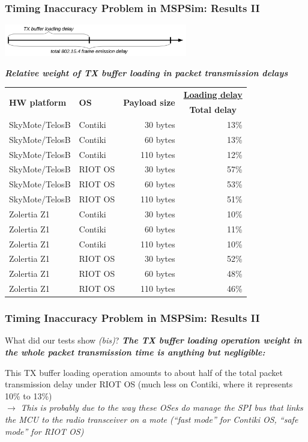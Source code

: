 \documentclass[10pt,c]{beamer}
\renewcommand{\emph}[1]{\textbf{\textit{#1}}}
\newcommand{\tblcaption}[1]{\textbf{\textsl{\small#1}}\vspace{0.1cm}}
\begin{document}
\begin{frame}
\frametitle{Timing Inaccuracy Problem in MSPSim: Results II}
\begin{center}
\vspace{-0.4cm}
\includegraphics[width=8cm]{Delays.png}
\vspace{0.1cm}

\tblcaption{\small Relative weight of TX buffer loading
            in packet transmission delays}
\small
\begin{tabular}{|l|l|r|r|}
\hline
\multirow{2}{2.5cm}{\textbf{HW platform}}
 & \multirow{2}{1cm}{\textbf{OS}}
  & \multirow{2}{2cm}{\textbf{Payload size}}
     & \multicolumn{1}{|c|}{\textbf{\underline{Loading delay}}} \\
 & & & \multicolumn{1}{|c|}{\textbf{Total delay}} \\
\hline
SkyMote/TelosB & Contiki &  30 bytes & 13\% \\
SkyMote/TelosB & Contiki &  60 bytes & 13\% \\
SkyMote/TelosB & Contiki & 110 bytes & 12\% \\
\hline
SkyMote/TelosB & RIOT OS &  30 bytes & 57\% \\
SkyMote/TelosB & RIOT OS &  60 bytes & 53\% \\
SkyMote/TelosB & RIOT OS & 110 bytes & 51\% \\
\hline
Zolertia Z1    & Contiki &  30 bytes & 10\% \\
Zolertia Z1    & Contiki &  60 bytes & 11\% \\
Zolertia Z1    & Contiki & 110 bytes & 10\% \\
\hline
Zolertia Z1    & RIOT OS &  30 bytes & 52\% \\
Zolertia Z1    & RIOT OS &  60 bytes & 48\% \\
Zolertia Z1    & RIOT OS & 110 bytes & 46\% \\
\hline
\end{tabular}
\end{center}
\end{frame}

\begin{frame}
\frametitle{Timing Inaccuracy Problem in MSPSim: Results II}
\begin{block}{What did our tests show \textit{(bis)}?}
\emph{The TX buffer loading operation weight in the whole packet
transmission time is anything but negligible:}

This TX buffer loading operation amounts to about half of the total
packet transmission delay under RIOT OS (much less on Contiki,
where it represents 10\% to 13\%) \\
$\rightarrow$ \textit{This is probably due to the way these OSes do manage
the SPI bus that links the MCU to the radio transceiver on a mote
(``fast mode'' for Contiki OS, ``safe mode'' for RIOT OS)}
\end{block}
\end{frame}
\end{document}
